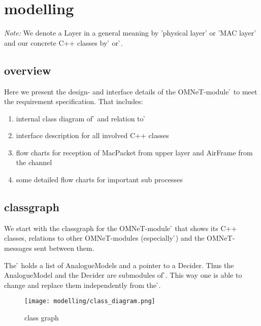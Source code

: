 \section{modelling}

\emph{Note: }We denote a Layer in a general meaning by 'physical layer' 
or 'MAC layer' and our concrete C++ classes by \h{\bp} or \h{\bm}.

\subsection{overview}

Here we present the design- and interface details of the OMNeT-module 
\h{\bp} to meet the requirement specification. That includes:

\begin{enumerate}
 \item internal class diagram of \h{\bp} and relation to \h{\bm}
 \item interface description for all involved C++ classes
 \item flow charts for reception of MacPacket from upper layer and 
 AirFrame from the channel
 \item some detailed flow charts for important sub processes
\end{enumerate}


\subsection{classgraph}

We start with the classgraph for the OMNeT-module \h{\bp} that shows 
its C++ classes, relations to other OMNeT-modules (especially \h{\bm})
and the OMNeT-messages sent between them.

The \h{\bp} holds a list of AnalogueModels and a pointer
to a
Decider. Thus the AnalogueModel and the Decider are submodules of \h{\bp}. This
way one is able to change
and
replace them
independently from
the \h{\bp}.

\begin{landscape}
\begin{figure}
 \centering
 \texttt{[image: modelling/class\_diagram.png]}
 \caption{class graph}
 \label{fig: classgraph}
\end{figure}
\end{landscape} 

